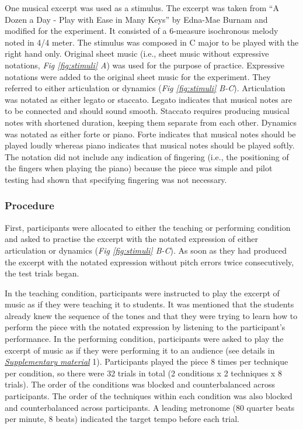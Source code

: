 \documentclass[
  man,floatsintext]{apa6}
\begin{document}
One musical excerpt was used as a stimulus. The excerpt was taken from ``A Dozen a Day - Play with Ease in Many Keys'' by Edna-Mae Burnam and modified for the experiment. It consisted of a 6-measure isochronous melody noted in 4/4 meter. The stimulus was composed in C major to be played with the right hand only. Original sheet music (i.e., sheet music without expressive notations, \emph{Fig \ref{fig:stimuli} A}) was used for the purpose of practice. Expressive notations were added to the original sheet music for the experiment. They referred to either articulation or dynamics (\emph{Fig \ref{fig:stimuli} B-C}). Articulation was notated as either legato or staccato. Legato indicates that musical notes are to be connected and should sound smooth. Staccato requires producing musical notes with shortened duration, keeping them separate from each other. Dynamics was notated as either forte or piano. Forte indicates that musical notes should be played loudly whereas piano indicates that musical notes should be played softly. The notation did not include any indication of fingering (i.e., the positioning of the fingers when playing the piano) because the piece was simple and pilot testing had shown that specifying fingering was not necessary.

\hypertarget{procedure}{%
\subsubsection{Procedure}\label{procedure}}

First, participants were allocated to either the teaching or performing condition and asked to practise the excerpt with the notated expression of either articulation or dynamics (\emph{Fig \ref{fig:stimuli} B-C}). As soon as they had produced the excerpt with the notated expression without pitch errors twice consecutively, the test trials began.

In the teaching condition, participants were instructed to play the excerpt of music as if they were teaching it to students. It was mentioned that the students already knew the sequence of the tones and that they were trying to learn how to perform the piece with the notated expression by listening to the participant's performance. In the performing condition, participants were asked to play the excerpt of music as if they were performing it to an audience (see details in \emph{\protect\hyperlink{supplementary}{Supplementary material}} 1). Participants played the piece 8 times per technique per condition, so there were 32 trials in total (2 conditions x 2 techniques x 8 trials). The order of the conditions was blocked and counterbalanced across participants. The order of the techniques within each condition was also blocked and counterbalanced across participants. A leading metronome (80 quarter beats per minute, 8 beats) indicated the target tempo before each trial.
\end{document}
